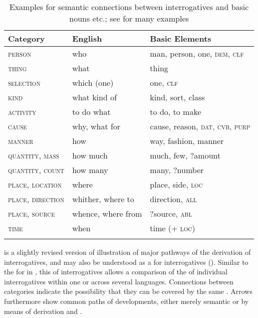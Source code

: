 \begin{table}
\caption{Examples for semantic connections between interrogatives and basic nouns etc.; see  for many examples}
\label{tab:4:8}

\begin{tabularx}{\textwidth}{QQl}
\lsptoprule

\textbf{Category} & \textbf{English} & \textbf{Basic Elements}\\
\midrule
\textsc{person} & who & man, person, one, \textsc{dem, clf}\\
\textsc{thing} & what & thing\\
\textsc{selection} & which (one) & one, \textsc{clf}\\
\textsc{kind} & what kind of & kind, sort, class\\
\textsc{activity} & to do what & to do, to make\\
\textsc{cause} & why, what for & cause, reason, \textsc{dat}, \textsc{cvb, purp}\\
\textsc{manner} & how & way, fashion, manner\\
\textsc{quantity, mass} & how much & much, few, ?amount\\
\textsc{quantity, count} & how many & many, ?number\\
\textsc{place, location} & where & place, side, \textsc{loc}\\
\textsc{place, direction} & whither, where to & direction, \textsc{all}\\
\textsc{place, source} & whence, where from & ?source, \textsc{abl}\\
\textsc{time} & when & time (+ \textsc{loc})\\
\lspbottomrule
\end{tabularx}
\end{table}

 is a slightly revised version of  illustration of major pathways of the derivation of interrogatives, and may also be understood as a  for interrogatives (\citealt{Hölzl2015c}). Similar to the  for  in , this  of interrogatives allows a comparison of the  of individual interrogatives within one or across several languages. Connections between categories indicate the possibility that they can be covered by the same . Arrows furthermore show common paths of developments, either merely semantic or by means of derivation and .

